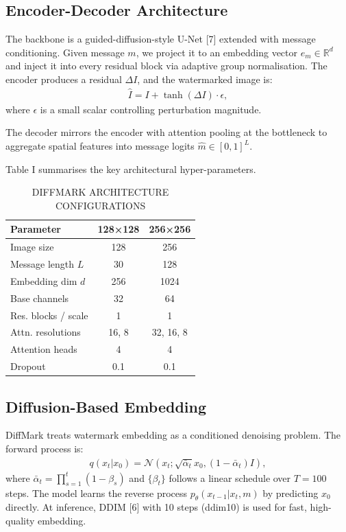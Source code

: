 \documentclass{article}
\begin{document}
\subsection{Encoder-Decoder Architecture}
The backbone is a guided-diffusion-style U-Net [7] extended with message conditioning. Given message $m$, we project it to an embedding vector $e_m \in \mathbb{R}^d$ and inject it into every residual block via adaptive group normalisation. The encoder produces a residual $\Delta I$, and the watermarked image is:
\begin{align}
\hat{I} = I + \tanh(\Delta I) \cdot \epsilon,
\end{align}
where $\epsilon$ is a small scalar controlling perturbation magnitude.

The decoder mirrors the encoder with attention pooling at the bottleneck to aggregate spatial features into message logits $\hat{m} \in [0,1]^L$.

Table I summarises the key architectural hyper-parameters.

\begin{table}[h]
\centering
\caption{DIFFMARK ARCHITECTURE CONFIGURATIONS}
\begin{tabular}{lcc}
\toprule
Parameter & 128×128 & 256×256 \\
\midrule
Image size & 128 & 256 \\
Message length $L$ & 30 & 128 \\
Embedding dim $d$ & 256 & 1024 \\
Base channels & 32 & 64 \\
Res. blocks / scale & 1 & 1 \\
Attn. resolutions & 16, 8 & 32, 16, 8 \\
Attention heads & 4 & 4 \\
Dropout & 0.1 & 0.1 \\
\bottomrule
\end{tabular}
\end{table}

\subsection{Diffusion-Based Embedding}
DiffMark treats watermark embedding as a conditioned denoising problem. The forward process is:
\begin{align}
q(x_t|x_0) = \mathcal{N}\left(x_t; \sqrt{\bar{\alpha}_t} x_0, (1-\bar{\alpha}_t) I\right),
\end{align}
where $\bar{\alpha}_t = \prod_{s=1}^t (1-\beta_s)$ and $\{\beta_t\}$ follows a linear schedule over $T=100$ steps. The model learns the reverse process $p_\theta(x_{t-1}|x_t, m)$ by predicting $x_0$ directly. At inference, DDIM [6] with 10 steps (ddim10) is used for fast, high-quality embedding.
\end{document}
